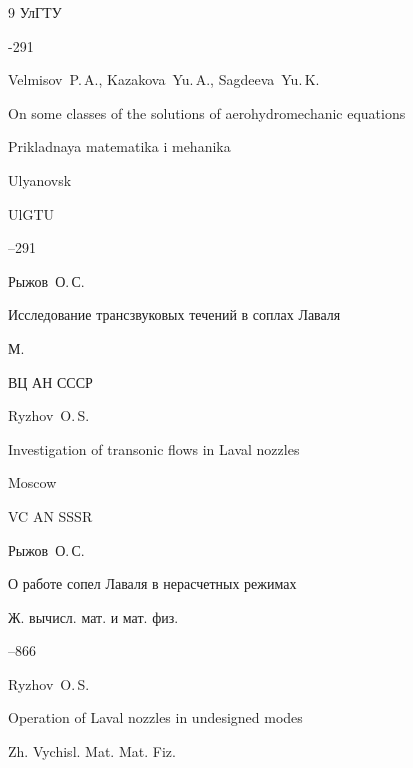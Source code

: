 \begin{thebibliography}{9}
\publ \mbox{УлГТУ}


-291

\misctransl

\by Velmisov~P.\,A., Kazakova~Yu.\,A., Sagdeeva~Yu.\,K.

\paper On some classes of the solutions of aerohydromechanic equations

\inbook Prikladnaya matematika i mehanika

\publaddr Ulyanovsk

\publ UlGTU



--291








\by Рыжов~О.\,С.

\book Исследование трансзвуковых течений в соплах Лаваля

\publaddr М.

\publ ВЦ АН СССР



\misctransl

\by Ryzhov~O.\,S.

\book Investigation of transonic flows in Laval nozzles

\publaddr Moscow

\publ VC AN SSSR






\by Рыжов~О.\,С.

\paper О работе сопел Лаваля в нерасчетных режимах

\jour Ж. вычисл. мат. и мат. физ.




--866

\misctransl

\by Ryzhov~O.\,S.

\paper Operation of Laval nozzles in undesigned modes

\jour Zh. Vychisl. Mat. Mat. Fiz.



\end{thebibliography}
